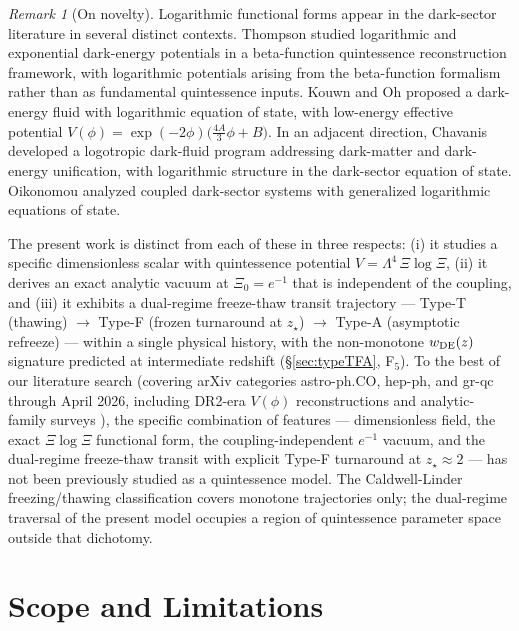 \documentclass[11pt,reqno]{amsart}
\theoremstyle{plain}
\theoremstyle{definition}
\theoremstyle{remark}
\newtheorem*{remark}{Remark}
\begin{document}
\begin{remark}[On novelty]
Logarithmic functional forms appear in the dark-sector literature in
several distinct contexts. Thompson \cite{Thompson2019} studied
logarithmic and exponential dark-energy potentials in a beta-function
quintessence reconstruction framework, with logarithmic potentials
arising from the beta-function formalism rather than as fundamental
quintessence inputs. Kouwn and Oh \cite{KouwnOh2012} proposed a
dark-energy fluid with logarithmic equation of state, with low-energy
effective potential $V(\phi) = \exp(-2\phi)\bigl(\tfrac{4A}{3}\phi + B\bigr)$.
In an adjacent direction, Chavanis \cite{Chavanis2015} developed a
logotropic dark-fluid program addressing dark-matter and dark-energy
unification, with logarithmic structure in the dark-sector equation of
state. Oikonomou \cite{Oikonomou2019} analyzed coupled dark-sector
systems with generalized logarithmic equations of state.

The present work is distinct from each of these in three respects: (i)
it studies a specific dimensionless scalar with quintessence potential
$V = \Lambda^{4}\,\Xi\log\Xi$, (ii) it derives an exact analytic vacuum
at $\Xi_0 = e^{-1}$ that is independent of the coupling, and (iii) it
exhibits a dual-regime freeze-thaw transit trajectory --- Type-T
(thawing) $\to$ Type-F (frozen turnaround at $z_\star$) $\to$ Type-A
(asymptotic refreeze) --- within a single physical history, with the
non-monotone $w_{\rm DE}(z)$ signature predicted at intermediate
redshift (\S\ref{sec:typeTFA}, F$_5$). To the best of our
literature search
(covering arXiv categories astro-ph.CO, hep-ph, and gr-qc through April
2026, including DR2-era $V(\phi)$ reconstructions and analytic-family
surveys
\cite{AdamEtAl2025,Adil2026Analytic,Wang2026QReconstruction}), the
specific combination of features --- dimensionless field, the exact
$\Xi\log\Xi$ functional form, the coupling-independent $e^{-1}$ vacuum,
and the dual-regime freeze-thaw transit with explicit Type-F turnaround
at $z_\star \approx 2$ --- has not been previously studied as a
quintessence model. The Caldwell-Linder \cite{CaldwellLinder2005}
freezing/thawing classification covers monotone trajectories only;
the dual-regime traversal of the present model occupies a region of
quintessence parameter space outside that dichotomy.
\end{remark}

\section{Scope and Limitations}\label{sec:scope}
\end{document}
